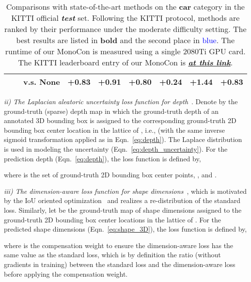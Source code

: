 \documentclass[letterpaper]{article} \usepackage{aaai22}  \usepackage{times}  \usepackage{helvet}  \usepackage{courier}  \usepackage[hyphens]{url}  \usepackage{graphicx} \urlstyle{rm} \def\UrlFont{\rm}  \usepackage{natbib}  \usepackage{caption} \DeclareCaptionStyle{ruled}{labelfont=normalfont,labelsep=colon,strut=off} \frenchspacing  \setlength{\pdfpagewidth}{8.5in}  \setlength{\pdfpageheight}{11in}  \usepackage{algorithm}
\begin{document}
\begin{table*}[t]
\begin{center}
{\begin{tabular}{l|c|c|ccc|ccc}
     & & v.s. None & +0.83 & +0.91 & +0.80
    & +0.24 & +1.44 & +0.83\\
    \bottomrule
    \end{tabular}}
\end{center}\vspace{-1mm}
\caption{Comparisons with state-of-the-art methods on the \textbf{car} category in the KITTI official \textit{\textbf{test}} set. Following the KITTI protocol, methods are ranked by their performance under the moderate difficulty setting. The best results are listed in \textbf{bold} and the second place in \textcolor{blue}{blue}.
The runtime of our MonoCon is measured using a single 2080Ti GPU card. The KITTI leaderboard entry of our MonoCon is \href{http://www.cvlibs.net/datasets/kitti/eval_object_detail.php?&result=59177e647b9ebb05bef36198cbaca61ff1d0eef2}{\textit{\textbf{at this link}}}. } \label{Tab:comparison_car} \vspace{-2mm}
\end{table*}



\textit{ii) The Laplacian aleatoric uncertainty loss function for depth}~\cite{monopair, monodle, monoflex}. 
Denote by  the ground-truth (sparse) depth map in which the ground-truth depth of an annotated 3D bounding box is assigned to the corresponding ground-truth 2D bounding box center location in the lattice of , i.e.,  (with the same inverse sigmoid transformation applied as in Eqn.~\ref{eq:depth}). The Laplace distribution is used in modeling the uncertainty  (Eqn.~\ref{eq:depth_uncertainty}). For the prediction depth  (Eqn.~\ref{eq:depth}), the loss function is defined by, 

where  is the set of ground-truth 2D bounding box center points, ,  and . 


\textit{iii) The dimension-aware  loss function for shape dimensions}~\cite{monodle}, which is motivated by the IoU oriented optimization~\cite{giou} and realizes a re-distribution of the standard  loss.  Similarly, let  be the ground-truth map of shape dimensions assigned to the ground-truth 2D bounding box center locations in the lattice of . For the predicted shape dimensions  (Eqn.~\ref{eq:shape_3D}), the loss function is defined by, 

where  is the compensation weight to ensure the dimension-aware  loss has the same value as the standard  loss, which is by definition the ratio (without gradients in training) between the standard  loss and the dimension-aware loss before applying the compensation weight.  
\end{document}
